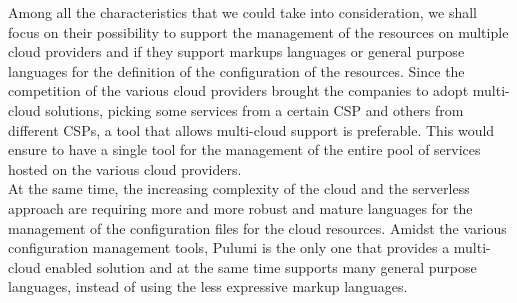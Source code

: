 Among all the characteristics that we could take into consideration, we shall focus on their possibility to support the management of the resources on multiple cloud providers and if they support markups languages or general purpose languages for the definition of the configuration of the resources.
Since the competition of the various cloud providers brought the companies to adopt multi-cloud solutions, picking some services from a certain CSP and others from different CSPs, a tool that allows multi-cloud support is preferable.
This would ensure to have a single tool for the management of the entire pool of services hosted on the various cloud providers.\\
At the same time, the increasing complexity of the cloud and the serverless approach are requiring more and more robust and mature languages for the management of the configuration files for the cloud resources.
Amidst the various configuration management tools, Pulumi is the only one that provides a multi-cloud enabled solution and at the same time supports many general purpose languages, instead of using the less expressive markup languages.\\

